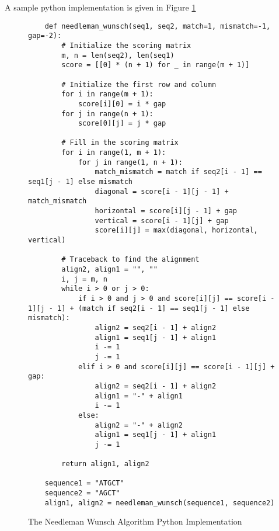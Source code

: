A sample python implementation is given in Figure \ref{fig:needleman-wunsch}

\begin{figure}[H]
    \centering
    \begin{lstlisting}
    def needleman_wunsch(seq1, seq2, match=1, mismatch=-1, gap=-2):
        # Initialize the scoring matrix
        m, n = len(seq2), len(seq1)
        score = [[0] * (n + 1) for _ in range(m + 1)]
    
        # Initialize the first row and column
        for i in range(m + 1):
            score[i][0] = i * gap
        for j in range(n + 1):
            score[0][j] = j * gap
    
        # Fill in the scoring matrix
        for i in range(1, m + 1):
            for j in range(1, n + 1):
                match_mismatch = match if seq2[i - 1] == seq1[j - 1] else mismatch
                diagonal = score[i - 1][j - 1] + match_mismatch
                horizontal = score[i][j - 1] + gap
                vertical = score[i - 1][j] + gap
                score[i][j] = max(diagonal, horizontal, vertical)
    
        # Traceback to find the alignment
        align2, align1 = "", ""
        i, j = m, n
        while i > 0 or j > 0:
            if i > 0 and j > 0 and score[i][j] == score[i - 1][j - 1] + (match if seq2[i - 1] == seq1[j - 1] else mismatch):
                align2 = seq2[i - 1] + align2
                align1 = seq1[j - 1] + align1
                i -= 1
                j -= 1
            elif i > 0 and score[i][j] == score[i - 1][j] + gap:
                align2 = seq2[i - 1] + align2
                align1 = "-" + align1
                i -= 1
            else:
                align2 = "-" + align2
                align1 = seq1[j - 1] + align1
                j -= 1
    
        return align1, align2
    
    sequence1 = "ATGCT"
    sequence2 = "AGCT"
    align1, align2 = needleman_wunsch(sequence1, sequence2)
    \end{lstlisting}
    \caption{The Needleman Wunsch Algorithm Python Implementation}
    \label{fig:needleman-wunsch}
\end{figure}

